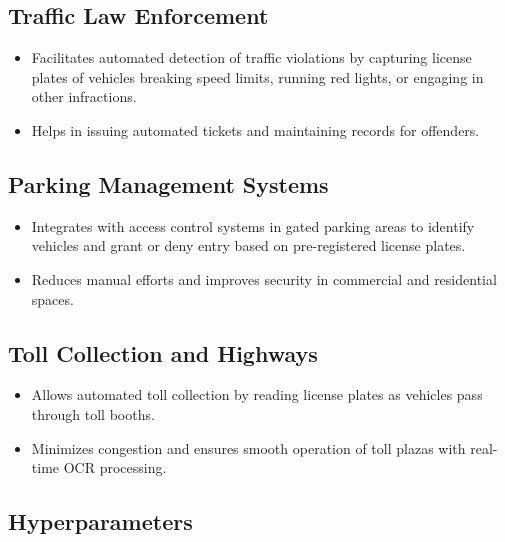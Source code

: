 \subsection*{Traffic Law Enforcement}
\begin{itemize}
	\item Facilitates automated detection of traffic violations by capturing license plates of vehicles breaking speed limits, running red lights, or engaging in other infractions.
	\item Helps in issuing automated tickets and maintaining records for offenders.
\end{itemize}
\subsection*{Parking Management Systems}
\begin{itemize}
	\item Integrates with access control systems in gated parking areas to identify vehicles and grant or deny entry based on pre-registered license plates.
	\item Reduces manual efforts and improves security in commercial and residential spaces.
\end{itemize}
\subsection*{Toll Collection and Highways}
\begin{itemize}
	\item Allows automated toll collection by reading license plates as vehicles pass through toll booths.
	\item Minimizes congestion and ensures smooth operation of toll plazas with real-time OCR processing.
	
\end{itemize}

\subsection{Hyperparameters}
